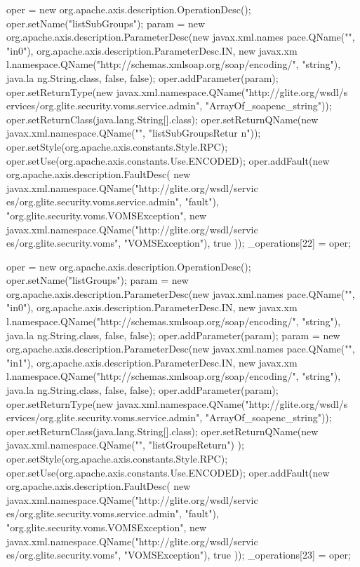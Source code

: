 \begin{DoxyCode}
{        oper = new org.apache.axis.description.OperationDesc();
        oper.setName("listSubGroups");
        param = new org.apache.axis.description.ParameterDesc(new javax.xml.names
      pace.QName("", "in0"), org.apache.axis.description.ParameterDesc.IN, new javax.xm
      l.namespace.QName("http://schemas.xmlsoap.org/soap/encoding/", "string"), java.la
      ng.String.class, false, false);
        oper.addParameter(param);
        oper.setReturnType(new javax.xml.namespace.QName("http://glite.org/wsdl/s
      ervices/org.glite.security.voms.service.admin", "ArrayOf_soapenc_string"));
        oper.setReturnClass(java.lang.String[].class);
        oper.setReturnQName(new javax.xml.namespace.QName("", "listSubGroupsRetur
      n"));
        oper.setStyle(org.apache.axis.constants.Style.RPC);
        oper.setUse(org.apache.axis.constants.Use.ENCODED);
        oper.addFault(new org.apache.axis.description.FaultDesc(
                      new javax.xml.namespace.QName("http://glite.org/wsdl/servic
      es/org.glite.security.voms.service.admin", "fault"),
                      "org.glite.security.voms.VOMSException",
                      new javax.xml.namespace.QName("http://glite.org/wsdl/servic
      es/org.glite.security.voms", "VOMSException"), 
                      true
                     ));
        _operations[22] = oper;

        oper = new org.apache.axis.description.OperationDesc();
        oper.setName("listGroups");
        param = new org.apache.axis.description.ParameterDesc(new javax.xml.names
      pace.QName("", "in0"), org.apache.axis.description.ParameterDesc.IN, new javax.xm
      l.namespace.QName("http://schemas.xmlsoap.org/soap/encoding/", "string"), java.la
      ng.String.class, false, false);
        oper.addParameter(param);
        param = new org.apache.axis.description.ParameterDesc(new javax.xml.names
      pace.QName("", "in1"), org.apache.axis.description.ParameterDesc.IN, new javax.xm
      l.namespace.QName("http://schemas.xmlsoap.org/soap/encoding/", "string"), java.la
      ng.String.class, false, false);
        oper.addParameter(param);
        oper.setReturnType(new javax.xml.namespace.QName("http://glite.org/wsdl/s
      ervices/org.glite.security.voms.service.admin", "ArrayOf_soapenc_string"));
        oper.setReturnClass(java.lang.String[].class);
        oper.setReturnQName(new javax.xml.namespace.QName("", "listGroupsReturn")
      );
        oper.setStyle(org.apache.axis.constants.Style.RPC);
        oper.setUse(org.apache.axis.constants.Use.ENCODED);
        oper.addFault(new org.apache.axis.description.FaultDesc(
                      new javax.xml.namespace.QName("http://glite.org/wsdl/servic
      es/org.glite.security.voms.service.admin", "fault"),
                      "org.glite.security.voms.VOMSException",
                      new javax.xml.namespace.QName("http://glite.org/wsdl/servic
      es/org.glite.security.voms", "VOMSException"), 
                      true
                     ));
        _operations[23] = oper;

}
\end{DoxyCode}
